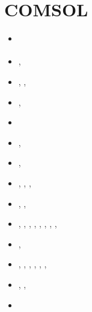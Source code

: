 \section{COMSOL} 

\begin{small}
\begin{itemize}
\item[\twothousandeight]       \textcite{vack08}
\item[\twothousandtwelve]      \textcite{ronb12}, \textcite{he__12}
\item[\twothousandfourteen]    \textcite{cuwi14}, \textcite{paml14b}, \textcite{patl14}
\item[\twothousandfifteen]     \textcite{rasg15}, \textcite{khfh15}
\item[\twothousandsixteen]     \textcite{dili16}
\item[\twothousandseventeen]   \textcite{lewa17}, \textcite{ryle17}
\item[\twothousandeighteen]    \textcite{kile18}, \textcite{yule18}
\item[\twothousandnineteen]    \textcite{keso19}, \textcite{doso19}, \textcite{leso19},
                               \textcite{bifl19}
\item[\twothousandtwenty]      \textcite{kiso20}, \textcite{joso20}, \textcite{yole20}
\item[\twothousandtwentyone]   \textcite{chap21}, \textcite{trbs21}, \textcite{khmo21},
                               \textcite{lesc21}, \textcite{dasm21}, \textcite{keso21},
                               \textcite{daml21}, \textcite{lewa21}, \textcite{leki21}
\item[\twothousandtwentytwo]   \textcite{shsb22}, \textcite{kilk22}    
\item[\twothousandtwentythree] \textcite{yole23}, \textcite{su__23}, \textcite{bals23},
                               \textcite{keso23}, \textcite{dosk23}, \textcite{leki23},
                               \textcite{hapl23} 
\item[\twothousandtwentyfour]  \textcite{dale24}, \textcite{derg24}, \textcite{lech24}
\item[\twothousandtwentyfive]  \textcite{doss25}
\end{itemize}
\end{small}


